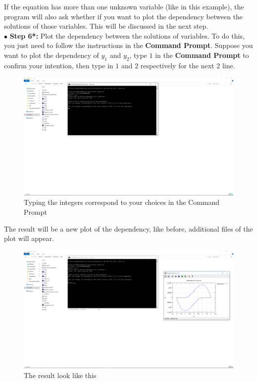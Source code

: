 \documentclass[a4paper,oneside]{book}
\numberwithin{equation}{chapter}
\begin{document}
	\noindent If the equation has more than one unknown variable (like in this example), the program will also ask whether if you want to plot the dependency between the solutions of those variables. This will be discussed in the next step.\\
	\noindent$\bullet$ \textbf{Step 6*:} Plot the dependency between the solutions of variables. To do this, you just need to follow the instructions in the \textbf{Command Prompt}. Suppose you want to plot the dependency of $y_1$ and $y_2$, type $1$ in the \textbf{Command Prompt} to confirm your intention, then type in $1$ and $2$ respectively for the next $2$ line.\\
	\begin{figure}[H]
		\centering	\includegraphics[width=15cm]{wfig9}
		\caption{Typing the integers correspond to your choices in the Command Prompt}
	\end{figure}
	\noindent The result will be a new plot of the dependency, like before, additional files of the plot will appear.
	\begin{figure}[H]
		\centering	\includegraphics[width=15cm]{wfig10}
		\caption{The result look like this}
	\end{figure}
\end{document}
